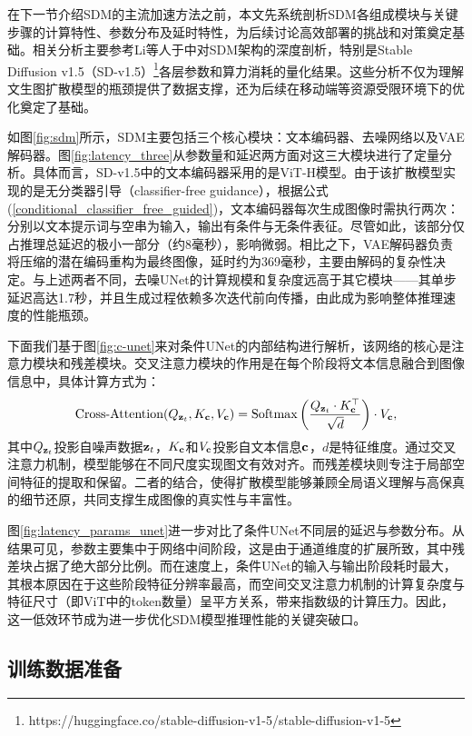 \documentclass[11pt,a4paper,UTF8]{ctexart}
\begin{document}
在下一节介绍SDM的主流加速方法之前，本文先系统剖析SDM各组成模块与关键步骤的计算特性、参数分布及延时特性，为后续讨论高效部署的挑战和对策奠定基础。相关分析主要参考Li等人于\cite{li2023snapfusion}中对SDM架构的深度剖析，特别是Stable Diffusion v1.5（SD-v1.5）\footnote{https://huggingface.co/stable-diffusion-v1-5/stable-diffusion-v1-5}各层参数和算力消耗的量化结果。这些分析不仅为理解文生图扩散模型的瓶颈提供了数据支撑，还为后续在移动端等资源受限环境下的优化奠定了基础。

如图\ref{fig:sdm}所示，SDM主要包括三个核心模块：文本编码器、去噪网络以及VAE解码器。图\ref{fig:latency_three}从参数量和延迟两方面对这三大模块进行了定量分析。具体而言，SD-v1.5中的文本编码器采用的是ViT-H模型\cite{radford2021learning}。由于该扩散模型实现的是无分类器引导（classifier-free guidance），根据公式(\ref{conditional_classifier_free_guided})，文本编码器每次生成图像时需执行两次：分别以文本提示词与空串为输入，输出有条件与无条件表征。尽管如此，该部分仅占推理总延迟的极小一部分（约8毫秒），影响微弱。相比之下，VAE解码器负责将压缩的潜在编码重构为最终图像，延时约为369毫秒，主要由解码的复杂性决定。与上述两者不同，去噪UNet的计算规模和复杂度远高于其它模块——其单步延迟高达1.7秒，并且生成过程依赖多次迭代前向传播，由此成为影响整体推理速度的性能瓶颈。

下面我们基于图\ref{fig:c-unet}来对条件UNet的内部结构进行解析，该网络的核心是注意力模块和残差模块。交叉注意力模块的作用是在每个阶段将文本信息融合到图像信息中，具体计算方式为：
\begin{equation*}
    \text{Cross-Attention}(Q_{\mathbf{z}_t},K_{\mathbf{c}},V_{\mathbf{c}})=\text{Softmax}\left(\frac{Q_{\mathbf{z}_t}\cdot K_{\mathbf{c}}^{\top}}{\sqrt{d}}\right)\cdot V_{\mathbf{c}},
\end{equation*}
其中$Q_{\mathbf{z}_t}$投影自噪声数据$\mathbf{z}_t$，$K_{\mathbf{c}}$和$V_{\mathbf{c}}$投影自文本信息$\mathbf{c}$，$d$是特征维度。通过交叉注意力机制，模型能够在不同尺度实现图文有效对齐。而残差模块则专注于局部空间特征的提取和保留。二者的结合，使得扩散模型能够兼顾全局语义理解与高保真的细节还原，共同支撑生成图像的真实性与丰富性。

图\ref{fig:latency_params_unet}进一步对比了条件UNet不同层的延迟与参数分布。从结果可见，参数主要集中于网络中间阶段，这是由于通道维度的扩展所致，其中残差块占据了绝大部分比例。而在速度上，条件UNet的输入与输出阶段耗时最大，其根本原因在于这些阶段特征分辨率最高，而空间交叉注意力机制的计算复杂度与特征尺寸（即ViT中的token数量）呈平方关系，带来指数级的计算压力。因此，这一低效环节成为进一步优化SDM模型推理性能的关键突破口。

\subsection{训练数据准备}
\end{document}
